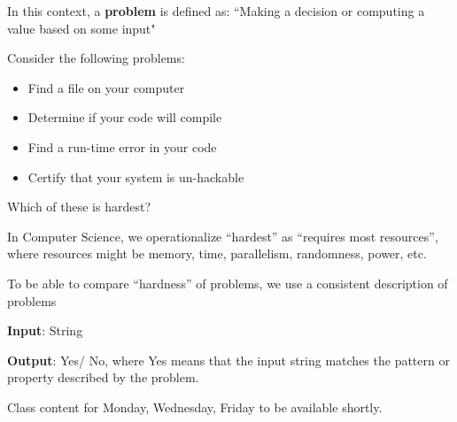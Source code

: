 \documentclass[12pt, oneside]{article}
\begin{document}
In this context, a {\bf problem} is defined as: ``Making a decision or computing a value based on some input"

Consider the following problems: 
\begin{itemize}
   \item Find a file on your computer
   \item Determine if your code will compile
   \item Find a run-time error in your code
   \item Certify that your system is un-hackable
\end{itemize}

Which of these is hardest?

\vfill

In Computer Science, we operationalize ``hardest'' as ``requires most resources'', where
resources might be memory, time, parallelism, randomness, power, etc.

To be able to compare ``hardness'' of problems, we use a consistent description of problems

{\bf Input}: String

{\bf Output}: Yes/ No, where Yes means that the input string matches the pattern or property described by the problem.


\newpage

Class content for Monday, Wednesday, Friday to be available shortly.
\end{document}
